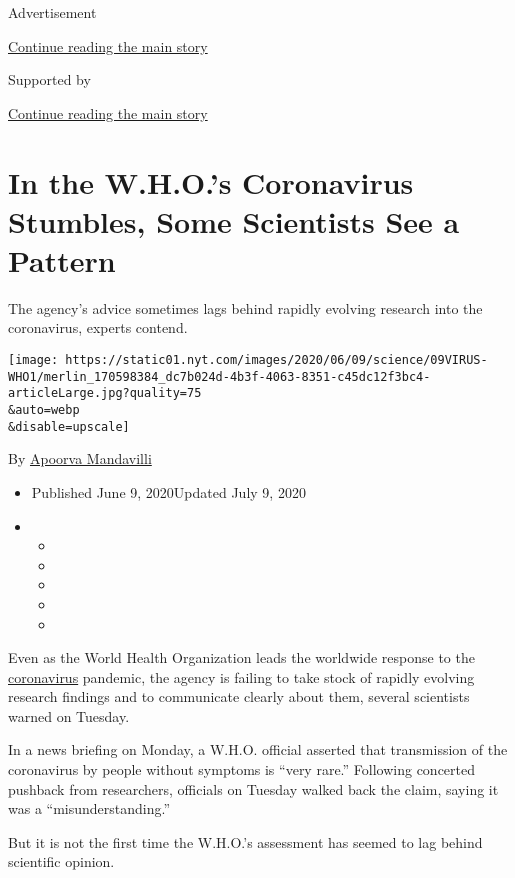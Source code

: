 Advertisement

\protect\hyperlink{after-top}{Continue reading the main story}

Supported by

\protect\hyperlink{after-sponsor}{Continue reading the main story}

\hypertarget{in-the-whos-coronavirus-stumbles-some-scientists-see-a-pattern}{%
\section{In the W.H.O.'s Coronavirus Stumbles, Some Scientists See a
Pattern}\label{in-the-whos-coronavirus-stumbles-some-scientists-see-a-pattern}}

The agency's advice sometimes lags behind rapidly evolving research into
the coronavirus, experts contend.

\texttt{[image: https://static01.nyt.com/images/2020/06/09/science/09VIRUS-WHO1/merlin\_170598384\_dc7b024d-4b3f-4063-8351-c45dc12f3bc4-articleLarge.jpg?quality=75\\\&auto=webp\\\&disable=upscale]}

By \href{https://www.nytimes.com/by/apoorva-mandavilli}{Apoorva
Mandavilli}

\begin{itemize}
\item
  Published June 9, 2020Updated July 9, 2020
\item
  \begin{itemize}
  \item
  \item
  \item
  \item
  \item
  \end{itemize}
\end{itemize}

Even as the World Health Organization leads the worldwide response to
the
\href{https://www.nytimes.com/2020/07/09/podcasts/the-daily/asymptomatic-coronavirus-spread.html}{coronavirus}
pandemic, the agency is failing to take stock of rapidly evolving
research findings and to communicate clearly about them, several
scientists warned on Tuesday.

In a news briefing on Monday, a W.H.O. official asserted that
transmission of the coronavirus by people without symptoms is ``very
rare.'' Following concerted pushback from researchers, officials on
Tuesday walked back the claim, saying it was a ``misunderstanding.''

But it is not the first time the W.H.O.'s assessment has seemed to lag
behind scientific opinion.

